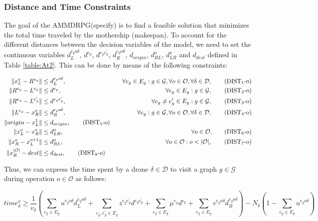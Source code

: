 \documentclass[10pt,a4paper]{elsarticle}
\def\AMD{{\sf AMMDRPG\xspace}}
\begin{document}
			\subsubsection*{Distance and Time Constraints}
			\noindent
			The goal of the \AMD\xspace (specify) is to find a feasible solution that minimizes the total time traveled by the mothership (makespan). To account for the different distances between the decision variables of the model, we need to set the continuous variables $d_L^{e_go\delta}$, $d^{e_g}$, $d^{e_ge^\prime_g}$, $d_R^{e_go\delta}$, $d_{origin}$, $d_{RL}^o$, $d_{LR}^o$ and $d_{dest}$ defined in Table \ref{table:At2}. This can be done by means of the following constraints:
			
			
			\begin{align*}
				\|x_L^o- R^{e_g}\| & \leq  d_L^{e_go\delta},  &\quad \forall e_g\in E_g:g\in \mathcal{G}, \forall o\in \mathcal O, \forall \delta\in\mathcal D, \tag{DIST$_{1}$-o} \label{eq:NOd1}\\
				\|R^{e_g}- L^{e_g}\| & \leq  d^{e_g},  &\quad \forall e_g\in E_g:g\in \mathcal{G}, \tag{DIST$_{2}$-o} \label{eq:NOd2}\\
				\|R^{e_g}- L^{e^\prime_g}\| & \leq  d^{e_ge^\prime_g}, &\quad \forall e_g\neq e_g'\in E_g:g\in \mathcal{G}, \tag{DIST$_{3}$-o} \label{eq:NOd3}\\
				\|L^{e_g}- x_R^o\| & \leq  d_R^{e_go\delta}, &\quad \forall e_g:g\in \mathcal{G},\forall o\in \mathcal O, \forall \delta\in\mathcal D, \tag{DIST$_{4}$-o} \label{eq:NOd4}\\
				\|origin - x_L^1\| & \leq d_{origin}, \tag{DIST$_5$-o}\label{eq:NOd5}\\
				\|x_L^o- x_R^o\| & \leq  d_{LR}^o, & \quad \forall o\in \mathcal O. \tag{DIST$_{6}$-o} \label{eq:NOd6}\\
				\|x_R^o- x_L^{o+1}\| & \leq  d_{RL}^o, & \quad \forall o\in \mathcal O:o<|\mathcal O|, \tag{DIST$_{7}$-o} \label{eq:NOd7}\\
				\|x_R^{|\mathcal O|} - dest\| & \leq d_{dest}, \tag{DIST$_8$-o}\label{eq:NOd8}\\
			\end{align*}
			
			\noindent
			Thus, we can express the time spent by a drone $\delta \in \mathcal D$ to visit a graph $g \in \mathcal G$ during operation $o \in \mathcal O$ as follows:
			
			\begin{equation}
				time_\delta^o \geq \frac{1}{v_\delta}\left(\sum_{e_g\in E_g} u^{e_go\delta}d_L^{e_go\delta} + \sum_{e_g, e^\prime_g\in E_g}z^{e_ge^\prime_g}d^{e_ge^\prime_g} + \sum_{e_g\in E_g} \mu^{e_g}d^{e_g} + \sum_{e_g\in E_g} v^{e_go\delta}d_R^{e_go\delta}\right) - N_\delta(1 - \sum_{e_g\in E_g} u^{e_go\delta})
				\label{eq:NOtimed}
			\end{equation}
			
\end{document}
